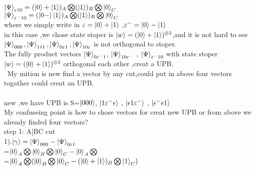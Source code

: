 \documentclass[a4paper,12pt]{article}
\begin{document}
 $ \ket{\Psi}_{\varepsilon10} =(\ket{0}+\ket{1})_{A}\bigotimes (\ket{1})_{B}\bigotimes\ket{0}_{C}$
 \newline \\
 
 $ \ket{\Psi}_{\varepsilon^{-} 10} =(\ket{0-}\ket{1})_{A}\bigotimes (\ket{1})_{B}\bigotimes\ket{0}_{C}$
 \newline  \\
 where we simply write in $\varepsilon=\ket{0}+\ket{1}$ ,$\varepsilon^{-}=\ket{0}-\ket{1}$
 \newline \\
 in this case ,we chose state stoper is $ \ket{w}=(\ket{0}+\ket{1})^{\otimes3} $,and it is not hard to see $ \ket{\Psi}_{000} ,  \ket{\Psi}_{111},\ket{\Psi}_{0\varepsilon1},\ket{\Psi}_{10\varepsilon}$ is not orthogonal to stoper.
 \newline \\
 The fully product vectors  $\ket{\Psi}_{0\varepsilon^{-}1}$,    $\ket{\Psi}_{10\varepsilon^{-}}$ , $\ket{\Psi}_{\varepsilon^{-} 10}$ with state stoper $\ket{w}=(\ket{0}+\ket{1})^{\otimes3}$  orthogonal each other ,creat a UPB.
 \newline \\\
 My mition is new find a vector by any cut,could put in above four vectors togather could creat an UPB.
 \newline \\\\
 new ,we have UPB is S={$\ket{000}$,    $\ket{1\varepsilon^{-} \epsilon}$ , $\ket{\epsilon1\varepsilon^{-}}$ , $\ket{\epsilon^{-}\epsilon1}$}
 \newline\\
 
 
 
 My confuseing point is how to chose vectors for creat new UPB or from above we already finded four vectors?
 \newline \\
 
 step 1:
 A|BC cut
 \newline \\
 1).$ \ket{\gamma} = \ket{\Psi}_{000} - \ket{\Psi}_{0\varepsilon1}$
 \newline \\
 
 =$\ket{0}_{A}\bigotimes \ket{0}_{B}\bigotimes\ket{0}_{C}-\ket{0}_{A}\bigotimes $
 \newline \\
 =$\ket{0}_{A}\bigotimes(\ket{0}_{B}\bigotimes\ket{0}_{C}-(\ket{0}+\ket{1})_{B}\bigotimes\ket{1}_{C}) $
 
\end{document}
